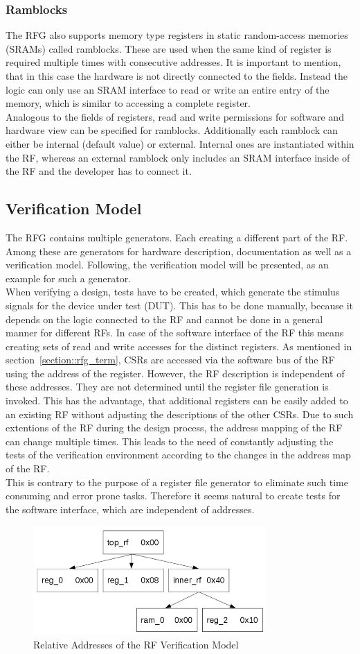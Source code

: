 \subsubsection{Ramblocks}\label{section::ramblocks}
The RFG also supports memory type registers in static random-access memories (SRAMs) called ramblocks. These are used when the same kind of register is required multiple times with consecutive addresses. It is important to mention, that in this case the hardware is not directly connected to the fields. Instead the logic can only use an SRAM interface to read or write an entire entry of the memory, which is similar to accessing a complete register.\\
Analogous to the fields of registers, read and write permissions for software and hardware view can be specified for ramblocks. Additionally each ramblock can either be internal (default value) or external. Internal ones are instantiated within the RF, whereas an external ramblock only includes an SRAM interface inside of the RF and the developer has to connect it.
\subsection{Verification Model}
The RFG contains multiple generators. Each creating a different part of the RF. Among these are generators for hardware description, documentation as well as a verification model. Following, the verification model will be presented, as an example for such a generator.\\
When verifying a design, tests have to be created, which generate the stimulus signals for the device under test (DUT). This has to be done manually, because it depends on the logic connected to the RF and cannot be done in a general manner for different RFs. In case of the software interface of the RF this means creating sets of read and write accesses for the distinct registers. As mentioned in section~\ref{section::rfg_term}, CSRs are accessed via the software bus of the RF using the address of the register. However, the RF description is independent of these addresses. They are not determined until the register file generation is invoked. This has the advantage, that additional registers can be easily added to an existing RF without adjusting the descriptions of the other CSRs. Due to such extentions of the RF during the design process, the address mapping of the RF can change multiple times. This leads to the need of constantly adjusting the tests of the verification environment according to the changes in the address map of the RF.\\
This is contrary to the purpose of a register file generator to eliminate such time consuming and error prone tasks. Therefore it seems natural to create tests for the software interface, which are independent of addresses.

\begin{figure}[h]
 \centering
 \includegraphics[width=252pt]{images/hierarchy_rf.png}
 \caption{Relative Addresses of the RF Verification Model}
\label{fig::rel_address}
\end{figure}
